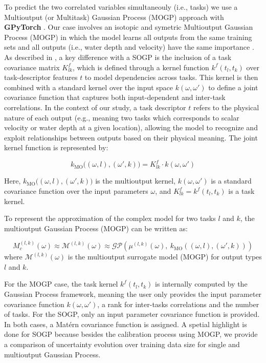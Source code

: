 \documentclass[draft,linenumbers,onecolumn]{agujournal2019} %
\begin{document}
To predict the two correlated variables simultaneouly (i.e., tasks) we use a Multioutput (or Multitask) Gaussian Process (MOGP) approach with \textbf{GPyTorch} \cite{gardner2018gpytorch}. Our case involves an isotopic and symetric Multioutput Gaussian Process (MOGP) in which the model learns all outputs from the same training sets and all outputs (i.e., water depth and velocity) have the same importance \cite{liu2018remarks}. As described in , a key difference with a SOGP is the inclusion of a task covariance matrix \( K_{lk}^{f} \), which is defined through a kernel function \( k^{f}{(t_l, t_k)} \) over task-descriptor features \( t \) to model dependencies across tasks. This kernel is then combined with a standard kernel over the input space \(k(\omega, \omega')\) to define a joint covariance function that captures both input-dependent and inter-task correlations. In the context of our study, a task descriptor \( t \) refers to the physical nature of each output (e.g., meaning two tasks which corresponds to scalar velocity or water depth at a given location), allowing the model to recognize and exploit relationships between outputs based on their physical meaning. The joint kernel function is represented by: 

\[
 k_{\text{MO}}\big((\omega, l), (\omega', k)\big) =  K_{lk}^{f} \cdot k(\omega, \omega')
\]

Here, \( k_{\text{MO}}\big((\omega, l), (\omega', k)\big) \) is the multioutput kernel, \( k(\omega, \omega') \) is a standard covariance function over the input parameters \( \omega \), and  \( K_{lk}^{f} = k^{f}{(t_l, t_k)} \) is a task kernel.

To represent the approximation of the complex model for two tasks \( l \) and \( k \), the multioutput Gaussian Process (MOGP) can be written as:

\[
M_c^{(l,k)}(\omega) \approx \mathcal{M}^{(l,k)}(\omega) \approx \mathcal{GP}\left(\mu^{(l,k)}(\omega),\ k_{\text{MO}}\left((\omega, l), (\omega', k)\right)\right)
\]
where \( \mathcal{M}^{(l,k)}(\omega) \) is the multioutput surrogate model (MOGP) for output types \( l \) and \( k \).


For the MOGP case, the task kernel \( k^{f}{(t_l, t_k)} \) is internally computed by the Gaussian Process framework, meaning the user only provides the input parameter covariance function \( k(\omega, \omega') \), a rank for inter-tasks correlations and the number of tasks. For the SOGP, only an input parameter covariance function is provided. In both cases, a Matérn covariance function is assigned. A spetial highlight is done for SOGP because besides the calibration process using MOGP, we provide a comparison of uncertainty evolution over training data size for single and multioutput Gaussian Process.  
\end{document}
